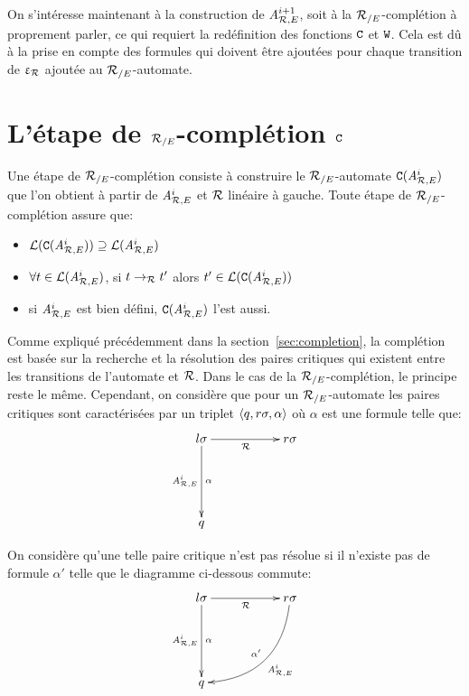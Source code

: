 On s'intéresse maintenant à la construction de ${\mathit A}_{\mathcal R,E}^{i+1}$, soit à la ${\mathcal R_{/E}}$-complétion à proprement parler, ce
qui requiert la redéfinition des fonctions $\mathtt{C}$ et $\mathtt{W}$. Cela est dû à la prise en compte des formules
qui doivent être ajoutées pour chaque transition de $\upvarepsilon_{\mathcal R}$ ajoutée au ${\mathcal R_{/E}}$-automate.


\section{L'étape de ${\mathcal R_{/E}}$-complétion $\mathtt{C}$}

Une étape de ${\mathcal R_{/E}}$-complétion consiste à construire le ${\mathcal R_{/E}}$-automate $\mathtt{C}({\mathit A}_{\mathcal R,E}^i)$ 
que l'on obtient à partir de ${\mathit A}_{\mathcal R,E}^i$ et $\mathcal R$ linéaire à gauche.
Toute étape de ${\mathcal R_{/E}}$-complétion assure que:

\begin{itemize}
\item $\mathcal{L}(\mathtt{C}({\mathit A}_{\mathcal R,E}^i)) \supseteq \mathcal{L}({\mathit A}_{\mathcal R,E}^i)$
\item $\forall t \in \mathcal{L}({\mathit A}_{\mathcal R,E}^i)$, si $t \rightarrow_\mathcal R t'$ alors $t' \in \mathcal{L}(\mathtt{C}({\mathit A}_{\mathcal R,E}^i))$
\item si ${\mathit A}_{\mathcal R,E}^i$ est bien défini, $\mathtt{C}({\mathit A}_{\mathcal R,E}^i)$ l'est aussi.
\end{itemize}


Comme expliqué précédemment dans la section~\ref{sec:completion}, la complétion est basée sur
la recherche et la résolution des paires critiques qui existent entre les transitions de l'automate 
et $\mathcal R$. Dans le cas de la ${\mathcal R_{/E}}$-complétion, le principe reste le même. Cependant, on considère
que pour un ${\mathcal R_{/E}}$-automate les paires critiques sont caractérisées par un triplet $\langle q, r\sigma, \alpha\rangle$
où $\alpha$ est une formule telle que:
  \[
  \xymatrix{
    l\sigma \ar[dd]_{\aaexeq^i}^{\alpha} \ar[rr]_{\R} && r\sigma\\
    \\
    q
  }
  \]

On considère qu'une telle paire critique n'est pas résolue si il n'existe pas de formule $\alpha'$ telle que 
le diagramme ci-dessous commute:
  \[
  \xymatrix{
    l\sigma \ar[dd]_{\aaexeq^i}^{\alpha} \ar[rr]_{\R} && r\sigma \ar@/^1.8pc/[ddll]_{\alpha'}^{\aaexeq^i}\\
    \\
    q
  }
  \]

